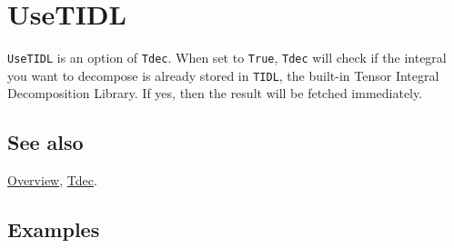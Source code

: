 \documentclass[../FeynCalcManual.tex]{subfiles}
\begin{document}
\hypertarget{usetidl}{%
\section{UseTIDL}\label{usetidl}}

\texttt{UseTIDL} is an option of \texttt{Tdec}. When set to
\texttt{True}, \texttt{Tdec} will check if the integral you want to
decompose is already stored in \texttt{TIDL}, the built-in Tensor
Integral Decomposition Library. If yes, then the result will be fetched
immediately.

\subsection{See also}

\hyperlink{toc}{Overview}, \hyperlink{tdec}{Tdec}.

\subsection{Examples}
\end{document}
